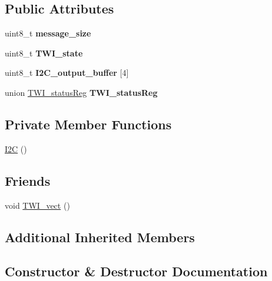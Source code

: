 \subsection*{Public Attributes}
\begin{DoxyCompactItemize}
\item 
uint8\+\_\+t {\bfseries message\+\_\+size}\hypertarget{class_i2_c_a88add0edd8c518054944a8188ab11d0c}{}\label{class_i2_c_a88add0edd8c518054944a8188ab11d0c}

\item 
uint8\+\_\+t {\bfseries T\+W\+I\+\_\+state}\hypertarget{class_i2_c_aeb2f95017c3d3440a3fc27a20994fac7}{}\label{class_i2_c_aeb2f95017c3d3440a3fc27a20994fac7}

\item 
uint8\+\_\+t {\bfseries I2\+C\+\_\+output\+\_\+buffer} \mbox{[}4\mbox{]}\hypertarget{class_i2_c_a4de289c8a3651d7b6aaca518844bb3f1}{}\label{class_i2_c_a4de289c8a3651d7b6aaca518844bb3f1}

\item 
union \hyperlink{union_t_w_i__status_reg}{T\+W\+I\+\_\+status\+Reg} {\bfseries T\+W\+I\+\_\+status\+Reg}\hypertarget{class_i2_c_a07cc6b21ede25e6b3ef1e9b3131108e6}{}\label{class_i2_c_a07cc6b21ede25e6b3ef1e9b3131108e6}

\end{DoxyCompactItemize}
\subsection*{Private Member Functions}
\begin{DoxyCompactItemize}
\item 
\hyperlink{class_i2_c_a7a9a84fccdacb3346ff97d6f3e158850}{I2C} ()
\end{DoxyCompactItemize}
\subsection*{Friends}
\begin{DoxyCompactItemize}
\item 
void \hyperlink{class_i2_c_a9d6ec6457f300cca833eb7193feabfbc}{T\+W\+I\+\_\+vect} ()
\end{DoxyCompactItemize}
\subsection*{Additional Inherited Members}


\subsection{Constructor \& Destructor Documentation}
